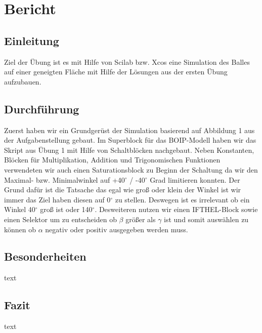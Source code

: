 \section{Bericht}

\subsection{Einleitung}
Ziel der Übung ist es mit Hilfe von Scilab bzw. Xcos eine Simulation des Balles auf einer geneigten Fläche mit Hilfe der Lösungen aus der ersten Übung aufzubauen.

\subsection{Durchführung}
Zuerst haben wir ein Grundgerüst der Simulation basierend auf Abbildung 1 aus der Aufgabenstellung gebaut. Im Superblock für das BOIP-Modell haben wir das Skript aus Übung 1 mit Hilfe von Schaltblöcken nachgebaut. Neben Konstanten, Blöcken für Multiplikation, Addition und Trigonomischen Funktionen verwendeten wir auch einen Saturationsblock zu Beginn der Schaltung da wir den Maximal- bzw. Minimalwinkel auf +40$^\circ$ / -40$^\circ$ Grad limitieren konnten. Der Grund dafür ist die Tatsache das egal wie groß oder klein der Winkel ist wir immer das Ziel haben diesen auf 0$^\circ$ zu stellen. Deswegen ist es irrelevant ob ein Winkel 40$^\circ$ groß ist oder 140$^\circ$.
Desweiteren nutzen wir einen IFTHEL-Block sowie einen Selektor um zu entscheiden ob $\beta$ größer als $\gamma$ ist und somit auswählen zu können ob $\alpha$ negativ oder positiv ausgegeben werden muss.

\subsection{Besonderheiten}
text

\subsection{Fazit}
text
